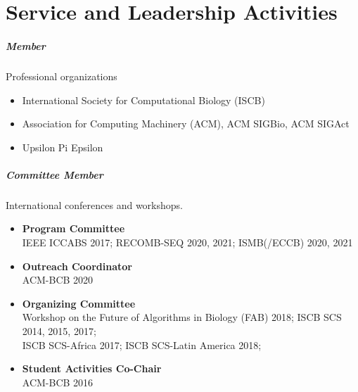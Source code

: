 \documentclass[10pt,letterpaper]{article}
\begin{document}
\section*{Service and Leadership Activities}


\subparagraph{Member} Professional organizations
\begin{itemize}
\item International Society for Computational Biology (ISCB)
\item Association for Computing Machinery (ACM), ACM SIGBio, ACM SIGAct
\item Upsilon Pi Epsilon
\end{itemize}

\subparagraph{Committee Member} International conferences and workshops.
\begin{itemize}[leftmargin=!,labelindent=5pt,itemindent=-15pt]
    \item \textbf{Program Committee} \\ IEEE ICCABS 2017; RECOMB-SEQ 2020, 2021; ISMB(/ECCB) 2020, 2021
    \item \textbf{Outreach Coordinator} \\ ACM-BCB 2020
    \item \textbf{Organizing Committee} \\
    Workshop on the Future of Algorithms in Biology (FAB) 2018; 
    ISCB SCS 2014, 2015, 2017;  \\
    ISCB SCS\nobreakdash-Africa 2017; 
    ISCB SCS-Latin America 2018;  
    \item \textbf{Student Activities Co-Chair} \\ ACM-BCB 2016
\end{itemize}
\end{document}
